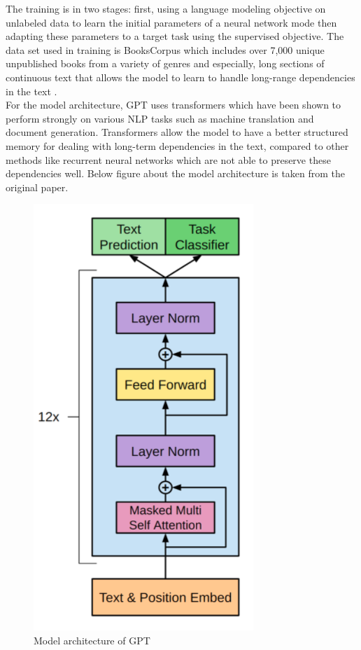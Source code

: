 \documentclass{article}
\begin{document}
The training is in two stages: first, using a language modeling objective on unlabeled data to learn the initial parameters of a neural network mode then adapting these parameters to a target task using the supervised objective. The data set used in training is BooksCorpus which includes over 7,000 unique unpublished books from a variety of genres and especially, long sections of continuous text that allows the model to learn to handle long-range dependencies in the text \cite{bookscorpus}.\\

For the model architecture, GPT uses transformers which have been shown to perform strongly on various NLP tasks such as machine translation and document generation. Transformers allow the model to have a better structured memory for dealing with long-term dependencies in the text, compared to other methods like recurrent neural networks which are not able to preserve these dependencies well. Below figure about the model architecture is taken from the original paper.

\begin{figure}[H]
	\centering
	\includegraphics[scale=0.3]{reports/Final report/images/gpt.png}
	\caption{Model architecture of GPT}
	\label{fig:gpt}
\end{figure}
\end{document}
